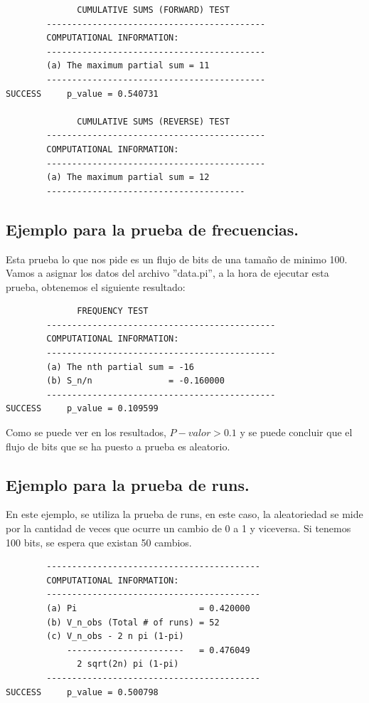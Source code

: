 \documentclass{llncs}
\theoremstyle{plane}
\begin{document}
\begin{itemize}
\begin{verbatim}
		      CUMULATIVE SUMS (FORWARD) TEST
		-------------------------------------------
		COMPUTATIONAL INFORMATION:
		-------------------------------------------
		(a) The maximum partial sum = 11
		-------------------------------------------
SUCCESS		p_value = 0.540731

		      CUMULATIVE SUMS (REVERSE) TEST
		-------------------------------------------
		COMPUTATIONAL INFORMATION:
		-------------------------------------------
		(a) The maximum partial sum = 12
		---------------------------------------
\end{verbatim}

\end{itemize}


\subsection{Ejemplo para la prueba de frecuencias.}

Esta prueba lo que nos pide es un flujo de bits de una tamaño de minimo 100. 
Vamos a asignar los datos del archivo ''data.pi'', a la hora de ejecutar esta prueba, obtenemos el siguiente resultado:
\begin{verbatim}
		      FREQUENCY TEST
		---------------------------------------------
		COMPUTATIONAL INFORMATION:
		---------------------------------------------
		(a) The nth partial sum = -16
		(b) S_n/n               = -0.160000
		---------------------------------------------
SUCCESS		p_value = 0.109599
\end{verbatim}

Como se puede ver en los resultados, $P-valor>0.1$ y se puede concluir que el flujo de bits que se ha puesto a prueba es aleatorio.


\subsection{Ejemplo para la prueba de runs.}
En este ejemplo, se utiliza la prueba de runs, en este caso, la aleatoriedad se mide por la cantidad de veces que ocurre un cambio de 0 a 1 y viceversa. Si tenemos 100 bits, se espera que existan 50 cambios.

\begin{verbatim}
		------------------------------------------
		COMPUTATIONAL INFORMATION:
		------------------------------------------
		(a) Pi                        = 0.420000
		(b) V_n_obs (Total # of runs) = 52
		(c) V_n_obs - 2 n pi (1-pi)
		    -----------------------   = 0.476049
		      2 sqrt(2n) pi (1-pi)
		------------------------------------------
SUCCESS		p_value = 0.500798
\end{verbatim}
\end{document}

